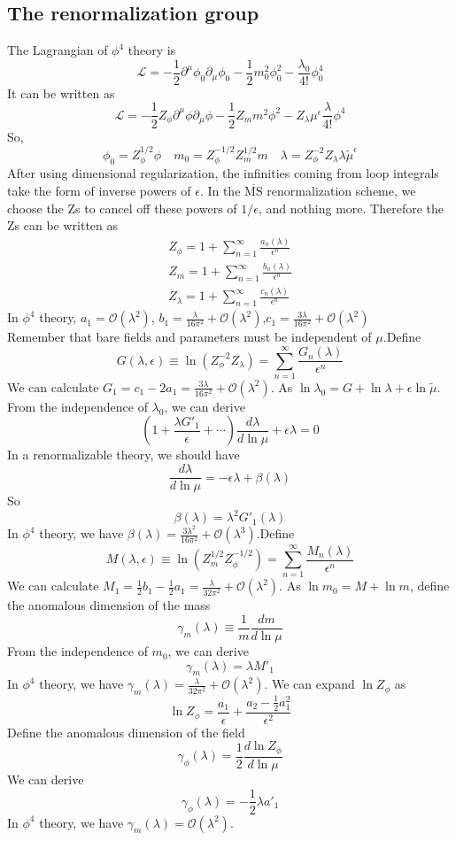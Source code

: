 \subsection{The renormalization group}
\noindent
The Lagrangian of $\phi^4$ theory is 
\[\mathcal{L} = -\frac{1}{2} \partial^{\mu} \phi_0 \partial_{\mu} \phi_0 -\frac{1}{2}m_0^2 \phi_0^2 - \frac{\lambda_0}{4!}\phi_0^4\]
It can be written as
\[\mathcal{L} = -\frac{1}{2}Z_{\phi} \partial^{\mu} \phi \partial_{\mu} \phi -\frac{1}{2}Z_{m}m^2 \phi^2 - Z_{\lambda} \mu^{\epsilon}\frac{\lambda}{4!}\phi^4\]
So, 
\[\phi_0 = Z_{\phi}^{1/2}\phi \quad m_0 = Z_{\phi}^{-1/2} Z_{m}^{1/2}m \quad \lambda = Z_{\phi}^{-2} Z_{\lambda} \lambda \tilde{\mu}^{\epsilon}\]
After using dimensional regularization, the infinities coming from loop integrals take the form of inverse powers of $\epsilon$. In the  $\mathrm{\overline{MS}}$ renormalization scheme, we choose the Zs to cancel off these powers of $1/\epsilon$, and nothing more. Therefore the Zs can be written as
\begin{eqnarray}
Z_{\phi} = 1 + \sum_{n=1}^{\infty} \frac{a_n(\lambda)}{\epsilon^n} \nonumber \\
Z_{m} = 1 + \sum_{n=1}^{\infty} \frac{b_n(\lambda)}{\epsilon^n} \nonumber \\
Z_{\lambda} = 1 + \sum_{n=1}^{\infty} \frac{c_n(\lambda)}{\epsilon^n} \nonumber 
\end{eqnarray}
In $\phi^4$ theory, $a_1 = \mathcal{O}(\lambda^2)$, $b_1 = \frac{\lambda}{16\pi^2} +  \mathcal{O}(\lambda^2)$,$c_1 = \frac{3\lambda}{16\pi^2} + \mathcal{O}(\lambda^2)$\\
Remember that bare fields and parameters must be independent of $\mu$.Define
\[G(\lambda,\epsilon) \equiv \ln(Z_{\phi}^{-2} Z_{\lambda}) = \sum_{n=1}^{\infty} \frac{G_n(\lambda)}{\epsilon^n}\]
We can calculate $G_1 = c_1 - 2a_1 = \frac{3\lambda}{16\pi^2} + \mathcal{O}(\lambda^2)$.
As $\ln \lambda_0 = G + \ln \lambda + \epsilon \ln \tilde{\mu} $. From the independence of $\lambda_0$, we can derive
\[\left ( 1 + \frac{\lambda G'_1}{\epsilon} + \cdots \right) \frac{d\lambda}{d\ln \mu} + \epsilon \lambda = 0\]
In a renormalizable theory, we should have
\[\frac{d\lambda}{d\ln\mu} = -\epsilon\lambda + \beta(\lambda)\]
So
\[\beta(\lambda) = \lambda^2 G'_1(\lambda)\]
In $\phi^4$ theory, we have $\beta(\lambda) = \frac{3\lambda^2}{16\pi^2} + \mathcal{O}(\lambda^3)$.Define
\[M(\lambda,\epsilon) \equiv \ln(Z_{m}^{1/2} Z_{\phi}^{-1/2}) = \sum_{n=1}^{\infty} \frac{M_n(\lambda)}{\epsilon^n}\]
We can calculate $M_1 = \frac{1}{2}b_1 - \frac{1}{2}a_1 = \frac{\lambda}{32\pi^2} + \mathcal{O}(\lambda^2)$.
As $\ln m_0 = M + \ln m $, define the anomalous dimension of the mass
\[\gamma_m(\lambda) \equiv \frac{1}{m} \frac{dm}{d \ln \mu}\]
From the independence of $m_0$, we can derive
\[\gamma_m(\lambda) = \lambda M'_1\]
In $\phi^4$ theory, we have $\gamma_m(\lambda) = \frac{\lambda}{32\pi^2} + \mathcal{O}(\lambda^2)$. We can expand $\ln Z_{\phi}$ as
\[\ln Z_{\phi} = \frac{a_1}{\epsilon} + \frac{a_2-\frac{1}{2}a_1^2}{\epsilon^2}\]
Define the anomalous dimension of the field
\[\gamma_{\phi}(\lambda) = \frac{1}{2} \frac{d\ln Z_{\phi}}{d \ln \mu}\]
We can derive
\[\gamma_{\phi}(\lambda) = -\frac{1}{2}\lambda a'_1\]
In $\phi^4$ theory, we have $\gamma_m(\lambda) = \mathcal{O}(\lambda^2)$.
